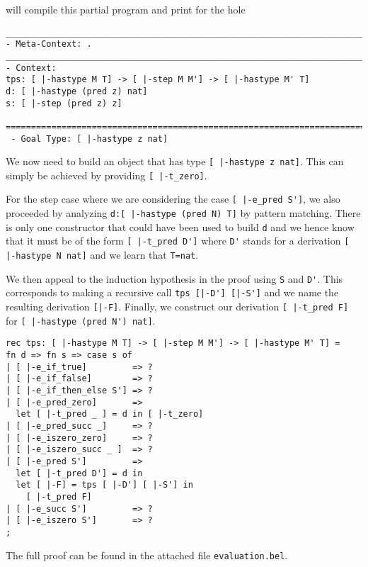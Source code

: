 \beluga will compile this partial program and print for the hole

\begin{lstlisting}
________________________________________________________________________________
- Meta-Context: .
________________________________________________________________________________
- Context:
tps: [ |-hastype M T] -> [ |-step M M'] -> [ |-hastype M' T]
d: [ |-hastype (pred z) nat]
s: [ |-step (pred z) z]

================================================================================
 - Goal Type: [ |-hastype z nat]

\end{lstlisting}



We now need to build an object that has type
\lstinline![ |-hastype z nat]!. This can simply be achieved by
providing
\lstinline![ |-t_zero]!.


For the step case where we are considering the case
\lstinline![ |-e_pred S']!, we also proceeded by analyzing
\lstinline!d:[ |-hastype (pred N) T]! by pattern matching. There is
only one constructor that could have been used to build \lstinline!d!
and we hence know that it must be of the form
\lstinline![ |-t_pred D']! where \lstinline!D'! stands for a
derivation
\lstinline![ |-hastype N nat]! and we learn that \lstinline!T=nat!.

We then appeal to the induction hypothesis in the proof
using \lstinline!S! and \lstinline!D'!. This corresponds to making a
recursive call \lstinline!tps [|-D'] [|-S']! and we name the resulting
derivation \lstinline![|-F]!. Finally, we construct our derivation
\lstinline![ |-t_pred F]! for \lstinline![ |-hastype (pred N') nat]!.

\begin{lstlisting}
rec tps: [ |-hastype M T] -> [ |-step M M'] -> [ |-hastype M' T] =
fn d => fn s => case s of
| [ |-e_if_true]         => ?
| [ |-e_if_false]        => ?
| [ |-e_if_then_else S'] => ?
| [ |-e_pred_zero]       =>
  let [ |-t_pred _ ] = d in [ |-t_zero]
| [ |-e_pred_succ _]     => ?
| [ |-e_iszero_zero]     => ?
| [ |-e_iszero_succ _ ]  => ?
| [ |-e_pred S']         =>
  let [ |-t_pred D'] = d in
  let [ |-F] = tps [ |-D'] [ |-S'] in
    [ |-t_pred F]
| [ |-e_succ S']         => ?
| [ |-e_iszero S']       => ?
;
\end{lstlisting}

The full proof can be found in the attached file \lstinline!evaluation.bel!.

